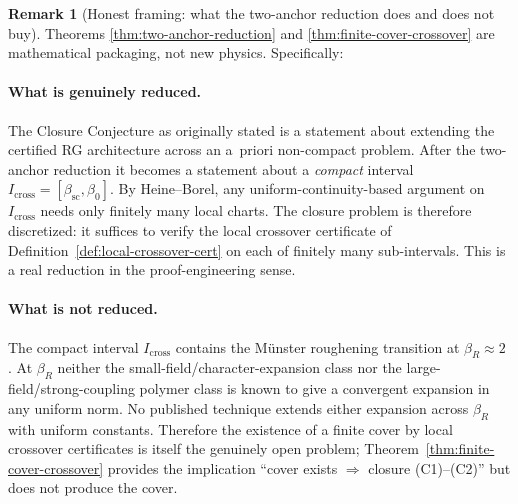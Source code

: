\documentclass[11pt]{article}
\theoremstyle{definition}
\newtheorem{remark}[theorem]{Remark}
\newcommand{\betasc}{\beta_{\mathrm{sc}}}
\begin{document}
\begin{remark}[Honest framing: what the two-anchor reduction does and
does not buy]\label{rem:two-anchor-honest}
Theorems \ref{thm:two-anchor-reduction} and \ref{thm:finite-cover-crossover}
are mathematical packaging, not new physics.  Specifically:

\paragraph{What is genuinely reduced.}  The Closure Conjecture as
originally stated is a statement about extending the certified RG
architecture across an a~priori non-compact problem.  After the
two-anchor reduction it becomes a statement about a \emph{compact}
interval $I_{\mathrm{cross}}=[\betasc,\beta_0]$.  By Heine--Borel,
any uniform-continuity-based argument on $I_{\mathrm{cross}}$ needs
only finitely many local charts.  The closure problem is therefore
discretized: it suffices to verify the local crossover certificate
of Definition~\ref{def:local-crossover-cert} on each of finitely
many sub-intervals.  This is a real reduction in the proof-engineering
sense.

\paragraph{What is not reduced.}  The compact interval
$I_{\mathrm{cross}}$ contains the M\"unster roughening transition at
$\beta_R\approx 2$ \cite{Munster81}.  At $\beta_R$ neither the
small-field/character-expansion class nor the large-field/strong-coupling
polymer class is known to give a convergent expansion in any uniform
norm.  No published technique extends either expansion across
$\beta_R$ with uniform constants.  Therefore the existence of a finite
cover by local crossover certificates is itself the genuinely open
problem; Theorem~\ref{thm:finite-cover-crossover} provides the
implication ``cover exists $\Rightarrow$ closure (C1)--(C2)'' but does
not produce the cover.


\end{remark}
\end{document}
